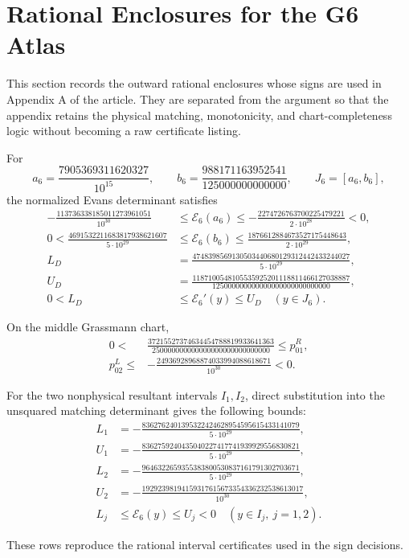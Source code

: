 \section{Rational Enclosures for the G6 Atlas}
\label{sec:g6-raw-enclosures}

This section records the outward rational enclosures whose signs are used in
Appendix A of the article. They are separated from the argument so that the
appendix retains the physical matching, monotonicity, and chart-completeness
logic without becoming a raw certificate listing.

For
\[
a_6=\frac{7905369311620327}{10^{15}},
\qquad
b_6=\frac{988171163952541}{125000000000000},
\qquad J_6=[a_6,b_6],
\]
the normalized Evans determinant satisfies
\begin{align*}
-\frac{113736338185011273961051}{10^{30}}
&\leq \mathcal E_6(a_6)
\leq-\frac{2274726763700225479221}{2\cdot10^{28}}<0,\\
0<\frac{4691532211683817938621607}{5\cdot10^{29}}
&\leq \mathcal E_6(b_6)
\leq\frac{1876612884673527175448643}{2\cdot10^{29}},\\
L_D&=\frac{4748398569130503440680129312442433244027}
 {5\cdot10^{29}},\\
U_D&=\frac{1187100548105535925201118811466127038887}
 {125000000000000000000000000000},\\
0<L_D&\leq \mathcal E_6'(y)\leq U_D
\quad(y\in J_6).
\end{align*}

On the middle Grassmann chart,
\begin{align*}
0<&\frac{37215527374634454788819933641363}
        {250000000000000000000000000000}
 \leq p_{01}^{R},\\
p_{02}^{L}\leq{}&
-\frac{24936928968874033994088618671}{10^{30}}<0.
\end{align*}

For the two nonphysical resultant intervals \(I_1,I_2\), direct substitution
into the unsquared matching determinant gives the following bounds:
\begin{align*}
L_1&=-\frac{8362762401395322424628954595615433141079}{5\cdot10^{29}},\\
U_1&=-\frac{8362759240435040227417741939929556830821}{5\cdot10^{29}},\\
L_2&=-\frac{9646322659355383800530837161791302703671}{5\cdot10^{29}},\\
U_2&=-\frac{19292398194159317615673354336232538613017}{10^{30}},\\
L_j&\leq\mathcal E_6(y)\leq U_j<0
\quad(y\in I_j,\ j=1,2).
\end{align*}

These rows reproduce the rational interval certificates used in the sign
decisions.
